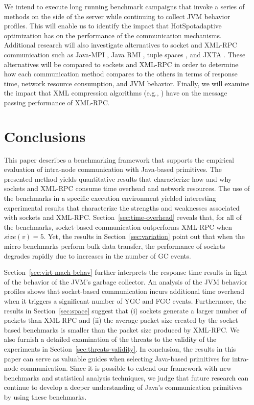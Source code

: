 \documentclass{sig-alternate}
\begin{document}
We intend to execute long running benchmark campaigns that invoke a
series of methods on the side of the server while continuing to
collect JVM behavior profiles.  This will enable us to identify the
impact that HotSpot\texttrademark adaptive optimization has on the
performance of the communication mechanisms.  Additional research will
also investigate alternatives to socket and XML-RPC communication such
as Java-MPI \cite{getov-mpi,judd-mpi-java}, Java RMI
\cite{grosso-rmi,maasen-java-rmi,wollrath-java-rmi}, tuple spaces
\cite{arnold-javaspace-rdb,fiedler-per,wells-linda-java-journal}, and
JXTA \cite{oaks-jxta,seigneur-jxta}.  These alternatives will be
compared to sockets and XML-RPC in order to determine how each
communication method compares to the others in terms of response time,
network resource consumption, and JVM behavior. Finally, we will
examine the impact that XML compression algorithms (e.g.,
\cite{min-xpress}) have on the message passing performance of XML-RPC.

\section{Conclusions}
\label{sec:conclusions}

This paper describes a benchmarking framework that supports the
empirical evaluation of intra-node communication with Java-based
primitives.  The presented method yields quantitative results that
characterize how and why sockets and XML-RPC consume time overhead and
network resources.  The use of the benchmarks in a specific execution
environment yielded interesting experimental results that characterize
the strengths and weaknesses associated with sockets and XML-RPC.
Section~\ref{sec:time-overhead} reveals that, for all of the
benchmarks, socket-based communication outperforms XML-RPC when
$size(v)=5$.  Yet, the results in Section~\ref{sec:variation} point
out that when the micro benchmarks perform bulk data transfer, the
performance of sockets degrades rapidly due to increases in the number
of GC events.

Section~\ref{sec:virt-mach-behav} further interprets the response time
results in light of the behavior of the JVM's garbage collector.  An
analysis of the JVM behavior profiles shows that socket-based
communication incurs additional time overhead when it triggers a
significant number of YGC and FGC events.  Furthermore, the results in
Section~\ref{sec:space} suggest that (i) sockets generate a larger
number of packets than XML-RPC and (ii) the average packet size
created by the socket-based benchmarks is smaller than the packet size
produced by XML-RPC.  We also furnish a detailed examination of the
threats to the validity of the experiments in
Section~\ref{sec:threats-validity}.  In conclusion, the results in
this paper can serve as valuable guides when selecting Java-based
primitives for intra-node communication.  Since it is possible to
extend our framework with new benchmarks and statistical analysis
techniques, we judge that future research can continue to develop a
deeper understanding of Java's communication primitives by using these
benchmarks.
\end{document}
